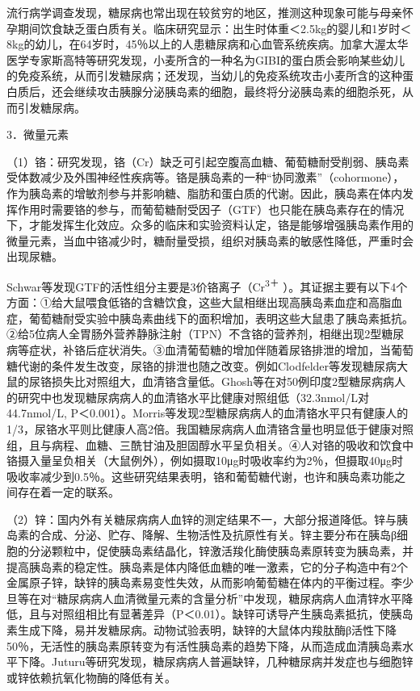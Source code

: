 流行病学调查发现，糖尿病也常出现在较贫穷的地区，推测这种现象可能与母亲怀孕期间饮食缺乏蛋白质有关。临床研究显示：出生时体重＜2.5kg的婴儿和1岁时＜8kg的幼儿，在64岁时，45％以上的人患糖尿病和心血管系统疾病。加拿大渥太华医学专家斯高特等研究发现，小麦所含的一种名为GIBI的蛋白质会影响某些幼儿的免疫系统，从而引发糖尿病；还发现，当幼儿的免疫系统攻击小麦所含的这种蛋白质后，还会继续攻击胰腺分泌胰岛素的细胞，最终将分泌胰岛素的细胞杀死，从而引发糖尿病。

{3．微量元素}

（1）铬：研究发现，铬（Cr）缺乏可引起空腹高血糖、葡萄糖耐受削弱、胰岛素受体数减少及外围神经性疾病等。铬是胰岛素的一种“协同激素”（cohormone），作为胰岛素的增敏剂参与并影响糖、脂肪和蛋白质的代谢。因此，胰岛素在体内发挥作用时需要铬的参与，而葡萄糖耐受因子（GTF）也只能在胰岛素存在的情况下，才能发挥生化效应。众多的临床和实验资料认定，铬是能够增强胰岛素作用的微量元素，当血中铬减少时，糖耐量受损，组织对胰岛素的敏感性降低，严重时会出现尿糖。

Schwar等发现GTF的活性组分主要是3价铬离子（Cr\textsuperscript{3＋}
）。其证据主要有以下4个方面：①给大鼠喂食低铬的含糖饮食，这些大鼠相继出现高胰岛素血症和高脂血症，葡萄糖耐受实验中胰岛素曲线下的面积增加，表明这些大鼠患了胰岛素抵抗。②给5位病人全胃肠外营养静脉注射（TPN）不含铬的营养剂，相继出现2型糖尿病等症状，补铬后症状消失。③血清葡萄糖的增加伴随着尿铬排泄的增加，当葡萄糖代谢的条件发生改变，尿铬的排泄也随之改变。例如Clodfelder等发现糖尿病大鼠的尿铬损失比对照组大，血清铬含量低。Ghosh等在对50例印度2型糖尿病病人的研究中也发现糖尿病病人的血清铬水平比健康对照组低（32.3nmol/L对44.7nmol/L,
P＜0.001）。Morris等发现2型糖尿病病人的血清铬水平只有健康人的1/3，尿铬水平则比健康人高2倍。我国糖尿病病人血清铬含量也明显低于健康对照组，且与病程、血糖、三酰甘油及胆固醇水平呈负相关。④人对铬的吸收和饮食中铬摄入量呈负相关（大鼠例外），例如摄取10μg时吸收率约为2％，但摄取40μg时吸收率减少到0.5％。这些研究结果表明，铬和葡萄糖代谢，也许和胰岛素功能之间存在着一定的联系。

（2）锌：国内外有关糖尿病病人血锌的测定结果不一，大部分报道降低。锌与胰岛素的合成、分泌、贮存、降解、生物活性及抗原性有关。锌主要分布在胰岛β细胞的分泌颗粒中，促使胰岛素结晶化，锌激活羧化酶使胰岛素原转变为胰岛素，并提高胰岛素的稳定性。胰岛素是体内降低血糖的唯一激素，它的分子构造中有2个金属原子锌，缺锌的胰岛素易变性失效，从而影响葡萄糖在体内的平衡过程。李少旦等在对“糖尿病病人血清微量元素的含量分析”中发现，糖尿病病人血清锌水平降低，且与对照组相比有显著差异（P＜0.01）。缺锌可诱导产生胰岛素抵抗，使胰岛素生成下降，易并发糖尿病。动物试验表明，缺锌的大鼠体内羧肽酶β活性下降50％，无活性的胰岛素原转变为有活性胰岛素的趋势下降，从而造成血清胰岛素水平下降。Juturu等研究发现，糖尿病病人普遍缺锌，几种糖尿病并发症也与细胞锌或锌依赖抗氧化物酶的降低有关。

